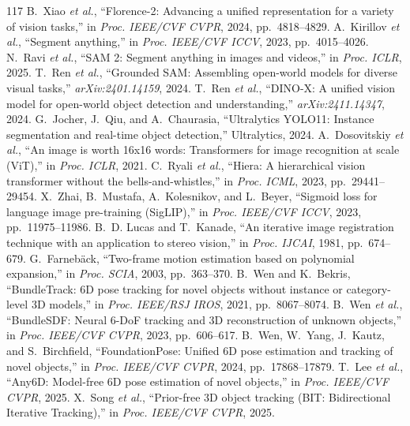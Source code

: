\documentclass[10pt,journal]{IEEEtran}
\begin{document}
{\begin{thebibliography}{117}
 B.~Xiao \emph{et al.}, ``Florence-2: Advancing a unified representation for a variety of vision tasks,'' in \emph{Proc. IEEE/CVF CVPR}, 2024, pp.~4818--4829.
 A.~Kirillov \emph{et al.}, ``Segment anything,'' in \emph{Proc. IEEE/CVF ICCV}, 2023, pp.~4015--4026.
 N.~Ravi \emph{et al.}, ``SAM 2: Segment anything in images and videos,'' in \emph{Proc. ICLR}, 2025.
 T.~Ren \emph{et al.}, ``Grounded SAM: Assembling open-world models for diverse visual tasks,'' \emph{arXiv:2401.14159}, 2024.
 T.~Ren \emph{et al.}, ``DINO-X: A unified vision model for open-world object detection and understanding,'' \emph{arXiv:2411.14347}, 2024.
 G.~Jocher, J.~Qiu, and A.~Chaurasia, ``Ultralytics YOLO11: Instance segmentation and real-time object detection,'' Ultralytics, 2024.
 A.~Dosovitskiy \emph{et al.}, ``An image is worth 16x16 words: Transformers for image recognition at scale (ViT),'' in \emph{Proc. ICLR}, 2021.
 C.~Ryali \emph{et al.}, ``Hiera: A hierarchical vision transformer without the bells-and-whistles,'' in \emph{Proc. ICML}, 2023, pp.~29441--29454.
 X.~Zhai, B.~Mustafa, A.~Kolesnikov, and L.~Beyer, ``Sigmoid loss for language image pre-training (SigLIP),'' in \emph{Proc. IEEE/CVF ICCV}, 2023, pp.~11975--11986.
 B.~D. Lucas and T.~Kanade, ``An iterative image registration technique with an application to stereo vision,'' in \emph{Proc. IJCAI}, 1981, pp.~674--679.
 G.~Farneb\"ack, ``Two-frame motion estimation based on polynomial expansion,'' in \emph{Proc. SCIA}, 2003, pp.~363--370.
 B.~Wen and K.~Bekris, ``BundleTrack: 6D pose tracking for novel objects without instance or category-level 3D models,'' in \emph{Proc. IEEE/RSJ IROS}, 2021, pp.~8067--8074.
 B.~Wen \emph{et al.}, ``BundleSDF: Neural 6-DoF tracking and 3D reconstruction of unknown objects,'' in \emph{Proc. IEEE/CVF CVPR}, 2023, pp.~606--617.
 B.~Wen, W.~Yang, J.~Kautz, and S.~Birchfield, ``FoundationPose: Unified 6D pose estimation and tracking of novel objects,'' in \emph{Proc. IEEE/CVF CVPR}, 2024, pp.~17868--17879.
 T.~Lee \emph{et al.}, ``Any6D: Model-free 6D pose estimation of novel objects,'' in \emph{Proc. IEEE/CVF CVPR}, 2025.
 X.~Song \emph{et al.}, ``Prior-free 3D object tracking (BIT: Bidirectional Iterative Tracking),'' in \emph{Proc. IEEE/CVF CVPR}, 2025.

\end{thebibliography}}
\end{document}
